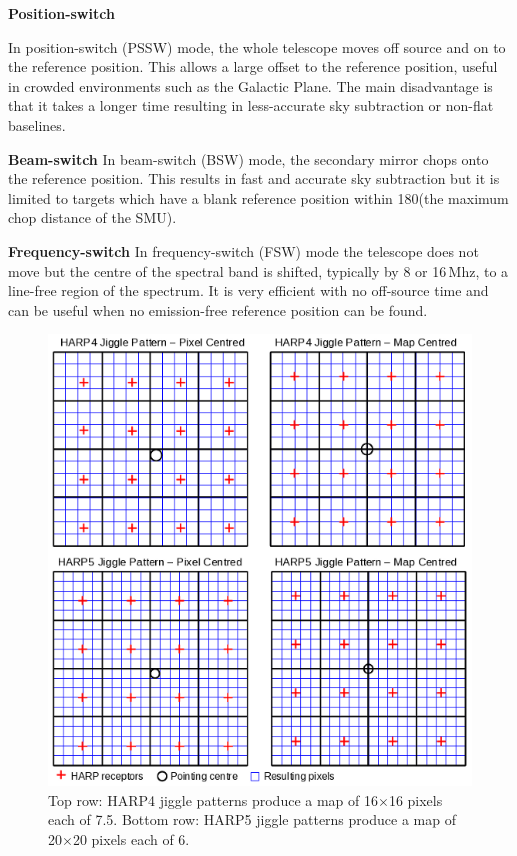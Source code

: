\documentclass[11pt,oneside,chapters]{starlink}
\newcommand{\uarcs}{\hspace{-0.27em}\arcsec\hspace{-0.07em}}
\newcommand{\uarcs}{$''$}
\begin{document}
\begin{aligndesc}
\item[\textbf{Position-switch}]

In position-switch (PSSW) mode, the whole telescope moves off source
and on to the reference position. This allows a large offset to the
reference position, useful in crowded environments such as the Galactic
Plane. The main disadvantage is that it takes a longer time resulting
in less-accurate sky subtraction or non-flat baselines.

\item[\textbf{Beam-switch}]
In beam-switch (BSW) mode, the secondary mirror chops onto the reference
position. This results in fast and accurate sky subtraction but it is
limited to targets which have a blank reference position within
180\arcsec (the maximum chop distance of the SMU).

\item[\textbf{Frequency-switch}]
In frequency-switch (FSW) mode the telescope does not move but the
centre of the spectral band is shifted, typically by 8 or 16\,Mhz,
to a line-free region of the spectrum. It is very efficient with no
off-source time and can be
useful when no emission-free reference position can be found.
\end{aligndesc}


\begin{figure}[b!]
\begin{center}
\includegraphics[width=0.8\linewidth]{sc20_jiggles}
\caption[HARP4 and HARP5 jiggle patterns]{\label{fig:jiggle}
  Top row: HARP4 jiggle patterns produce a map of 16$\times$16 pixels
  each of 7.\uarcs5. Bottom row: HARP5 jiggle patterns produce a map of
  20$\times$20 pixels each of 6\arcsec. }
\end{center}
\end{figure}
\end{document}
